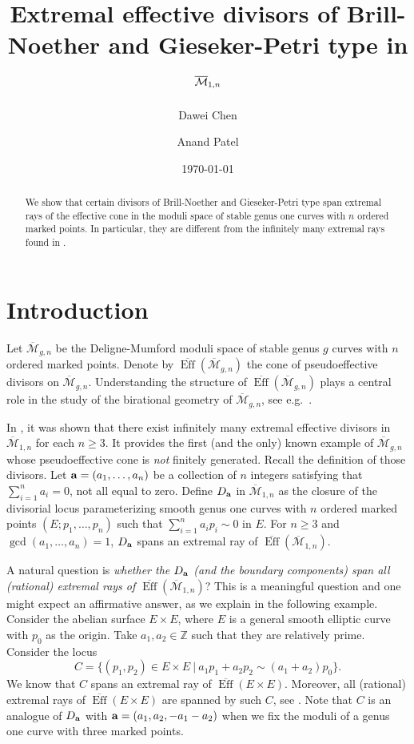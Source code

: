 \documentclass[11]{amsart}
\title{Extremal effective divisors of Brill-Noether and Gieseker-Petri type in $\BM_{1,n}$}
\date{\today}
\author{Dawei Chen}
\author{Anand Patel}
\theoremstyle{plain}
\theoremstyle{definition}
\newcommand{\BM}{\overline{\mathcal M}}
\newcommand{\BEff}{\overline{\operatorname{Eff}}}
\newcommand{\bbZ}{\mathbb Z}
\begin{document}
\begin{abstract}
We show that certain divisors of Brill-Noether and Gieseker-Petri type span extremal rays of the effective cone in the moduli space of stable genus one curves with $n$ ordered marked points. In particular, they are different from the infinitely many extremal rays found in \cite{ChenCoskun}. 
\end{abstract}

\maketitle

\setcounter{tocdepth}{1}

\tableofcontents


\section{Introduction}
\label{sec:intro}


Let $\BM_{g,n}$ be the Deligne-Mumford moduli space of stable genus $g$ curves with $n$ ordered marked points. Denote by $\BEff(\BM_{g,n})$ the cone 
of pseudoeffective divisors on $\BM_{g,n}$. Understanding the structure of $\BEff(\BM_{g,n})$ plays a central role in the study of the birational geometry 
of $\BM_{g,n}$, see e.g.~\cite{HarrisMumfordKodaira, HarrisKodaira, EisenbudHarrisKodaira, FarkasKoszul, LoganKodaira, Vermeire, CastravetTevelev}. 

In \cite[Theorem 1.1]{ChenCoskun}, it was shown that there exist infinitely many extremal effective divisors in $\BM_{1,n}$ for each $n\geq 3$. It provides the first (and the only) known example of $\BM_{g,n}$ whose pseudoeffective cone is \emph{not} finitely generated. Recall the definition of those divisors. Let ${\bf a} = (a_1, \ldots, a_n)$ be a collection of $n$ integers satisfying that $\sum_{i=1}^n a_i = 0$, not all equal to zero. Define $D_{\bf a}$ in $\BM_{1,n}$ as the closure of the divisorial locus parameterizing smooth genus one curves with $n$ ordered marked points $(E; p_1, \ldots, p_n)$ such that $\sum_{i=1}^n a_i p_i \sim 0$ in $E$. For $n\geq 3$ and $\gcd (a_1, \ldots, a_n) = 1$, $D_{\bf a}$ spans an extremal ray 
of $\BEff(\BM_{1,n})$. 

A natural question is \emph{whether the $D_{\bf a}$ (and the boundary components) span all (rational) extremal rays of $\BEff(\BM_{1,n})$}? This is a meaningful question and one might expect an affirmative answer, as we explain in the following example. Consider the abelian surface 
$E\times E$, where $E$ is a general smooth elliptic curve with $p_0$ as the origin. Take $a_1, a_2 \in \bbZ$ such that they are relatively prime. Consider the locus  
$$C = \{(p_1, p_2)\in E\times E\ | \ a_1 p_1 + a_2 p_2 \sim (a_1+a_2)p_0 \}.$$ 
We know that $C$ spans an extremal ray 
of $\BEff(E\times E)$. Moreover, all (rational) extremal rays of $\BEff(E\times E)$ are spanned by such $C$, see \cite[II 4.16]{Kollar}. 
Note that $C$ is an analogue of $D_{\bf a}$ with ${\bf a} = (a_1, a_2, -a_1 - a_2)$ when we fix the moduli of a genus one curve with three marked points. 
\end{document}
